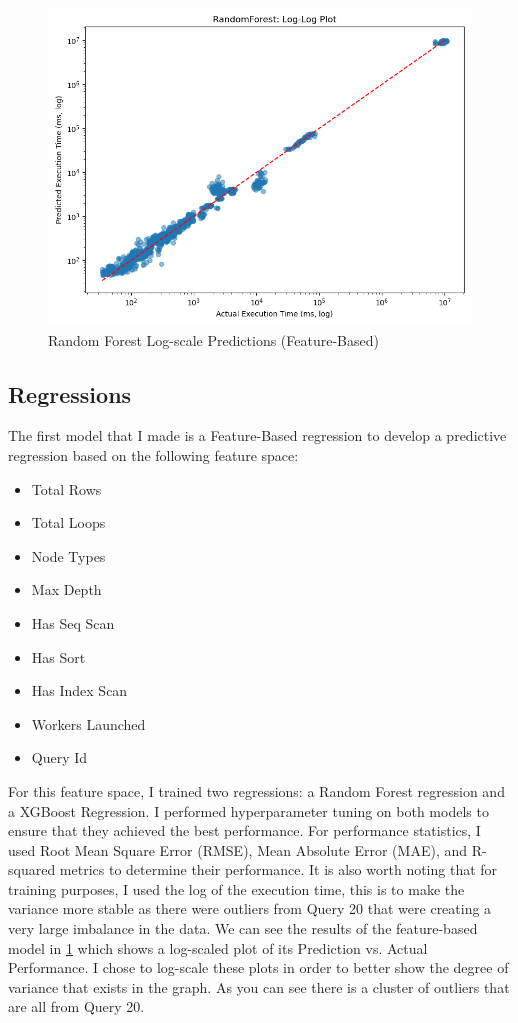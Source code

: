 \documentclass[sigconf]{acmart}
\begin{document}
\begin{figure}[h!]
  \centering
  \includegraphics[width=\linewidth]{feature_based_rf/logscale.png}
  \caption{Random Forest Log-scale Predictions (Feature-Based)}
  \label{fig:rf-feature-log}
\end{figure}

\subsection{Regressions}
The first model that I made is a Feature-Based regression  to develop a predictive regression based on the following feature space:
\begin{multicols}{2}
\begin{itemize}
  \item Total Rows
  \item Total Loops
  \item Node Types
  \item Max Depth
  \item Has Seq Scan
  \item Has Sort
  \item Has Index Scan
  \item Workers Launched
  \item Query Id
\end{itemize}
\end{multicols}

For this feature space, I trained two regressions: a Random Forest regression and a XGBoost Regression. I performed hyperparameter tuning on both models to ensure that they achieved the best performance.
For performance statistics, I used Root Mean Square Error (RMSE), Mean Absolute Error (MAE), and R-squared metrics to determine their performance. It is also worth noting that for training purposes, I used the log
of the execution time, this is to make the variance more stable as there were outliers from Query 20 that were creating a very large imbalance in the data. We can see the results of the feature-based model in \ref{fig:rf-feature-log}
which shows a log-scaled plot of its Prediction vs. Actual Performance. I chose to log-scale these plots in order to better show the degree of variance that exists in the graph. As you can see there is a cluster of outliers that
are all from Query 20.
\end{document}
